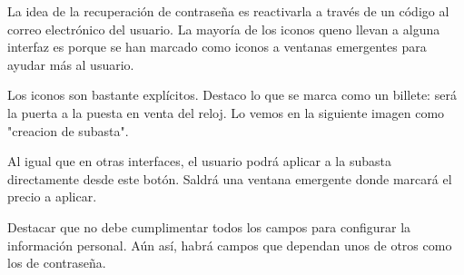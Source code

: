 	La idea de la recuperación de contraseña es reactivarla a través de un código al correo electrónico del usuario. La mayoría de los iconos queno llevan a alguna interfaz es porque se han marcado como iconos a ventanas emergentes para ayudar más al usuario.
	

	Los iconos son bastante explícitos. Destaco lo que se marca como un billete: será la puerta a la puesta en venta del reloj. Lo vemos en la siguiente imagen como "creacion de subasta".



	Al igual que en otras interfaces, el usuario podrá aplicar a la subasta directamente desde este botón. Saldrá una ventana emergente donde marcará el precio a aplicar.
	

	Destacar que no debe cumplimentar todos los campos para configurar la información personal. Aún así, habrá campos que dependan unos de otros como los de contraseña.
